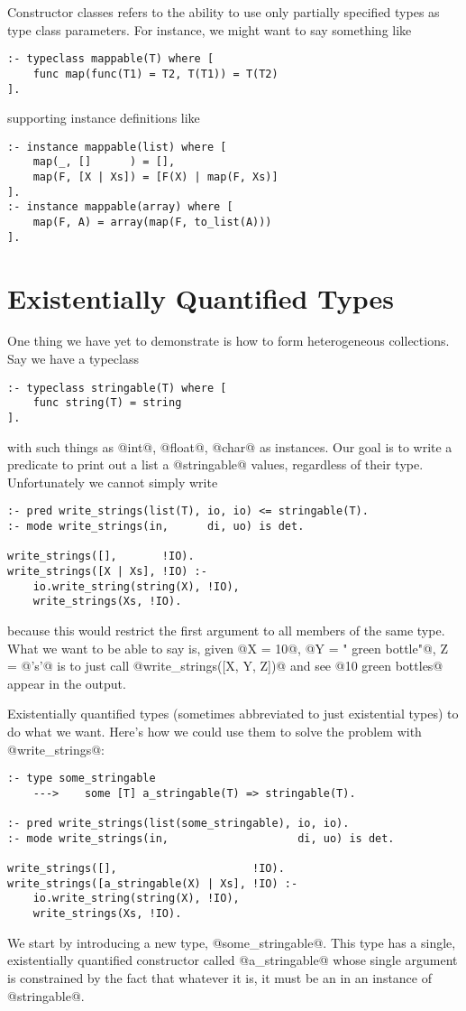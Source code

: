 Constructor classes refers to the ability to use only partially
specified types as type class parameters.  For instance, we might want
to say something like
\begin{verbatim}
:- typeclass mappable(T) where [
    func map(func(T1) = T2, T(T1)) = T(T2)
].
\end{verbatim}
supporting instance definitions like
\begin{verbatim}
:- instance mappable(list) where [
    map(_, []      ) = [],
    map(F, [X | Xs]) = [F(X) | map(F, Xs)]
].
:- instance mappable(array) where [
    map(F, A) = array(map(F, to_list(A)))
].
\end{verbatim}


\section{Existentially Quantified Types}

One thing we have yet to demonstrate is how to form heterogeneous
collections.  Say we have a typeclass
\begin{verbatim}
:- typeclass stringable(T) where [
    func string(T) = string
].
\end{verbatim}
with such things as @int@, @float@, @char@ as instances.  Our goal is to
write a predicate to print out a list a @stringable@ values, regardless
of their type.  Unfortunately we cannot simply write
\begin{verbatim}
:- pred write_strings(list(T), io, io) <= stringable(T).
:- mode write_strings(in,      di, uo) is det.

write_strings([],       !IO).
write_strings([X | Xs], !IO) :-
    io.write_string(string(X), !IO),
    write_strings(Xs, !IO).
\end{verbatim}
because this would restrict the first argument to all members of the
same type.  What we want to be able to say is, given @X = 10@,
@Y = " green bottle"@, Z = @'s'@ is to just call
@write_strings([X, Y, Z])@ and see @10 green bottles@ appear in the
output.

Existentially quantified types (sometimes abbreviated to just
existential types) to do what we want.  Here's how we could use them to
solve the problem with @write_strings@:
\begin{verbatim}
:- type some_stringable
    --->    some [T] a_stringable(T) => stringable(T).

:- pred write_strings(list(some_stringable), io, io).
:- mode write_strings(in,                    di, uo) is det.

write_strings([],                     !IO).
write_strings([a_stringable(X) | Xs], !IO) :-
    io.write_string(string(X), !IO),
    write_strings(Xs, !IO).
\end{verbatim}
We start by introducing a new type, @some_stringable@.  This type has a 
single, existentially quantified constructor called @a_stringable@ whose
single argument is constrained by the fact that whatever it is, it must
be an in an instance of @stringable@.

